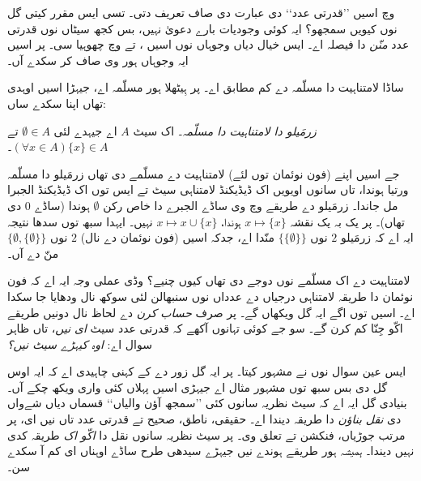 \documentclass[../../../include/open-logic-section]{subfiles}
\begin{document}


 وچ اسیں ’’قدرتی عدد‘‘ دی عبارت دی صاف
تعریف دتی۔ تسی ایس مقرر کیتی گل نوں کیویں سمجھو؟ ایہ کوئی وجودیات بارے
دعویٰ نہیں، بس کجھ سیٹاں نوں قدرتی عدد \emph{منّن} دا فیصلہ اے۔ ایس خیال
دیاں وجوہاں نوں اسیں ، 
تے  وچ چھوہیا سی۔ پر اسیں
ایہ وجوہاں ہور وی صاف کر سکدے آں۔

ساڈا لامتناہیت دا مسلّمہ \citet{VonNeumann1925} دے کم مطابق اے۔
پر ہِیٹھلا ہور مسلّمہ اے، جیہڑا اسیں اوہدی تھاں اپنا سکدے ساں:

\begin{defish}
\emph{زرمَیلو دا \citeyear{Zermelo1908Untersuchungen} لامتناہیت دا مسلّمہ۔}
اک سیٹ $A$ اے جیہدے لئی $\emptyset \in A$ تے
$(\forall x \in A)\{x\} \in A$۔
\end{defish}

جے اسیں اپنے (فون نوئمان توں لئے) لامتناہیت دے مسلّمے دی تھاں زرمَیلو دا
مسلّمہ ورتیا ہوندا، تاں سانوں اویویں اک ڈیڈیکنڈ لامتناہی سیٹ تے ایس توں
اک ڈیڈیکنڈ الجبرا مل جاندا۔ زرمَیلو دے طریقے وچ وی ساڈے الجبرے دا خاص
رکن $\emptyset$ ہوندا (ساڈے $0$ دی تھاں)۔ پر یک بہ یک نقشہ
$x \mapsto \{x\}$ ہوندا، $x \mapsto x \cup \{x\}$ نہیں۔
ایہدا سبھ توں سدھا نتیجہ ایہ اے کہ زرمَیلو $2$ نوں $\{\{\emptyset\}\}$
منّدا اے، جدکہ اسیں (فون نوئمان دے نال) $2$ نوں $\{\emptyset, \{\emptyset\}\}$
منّ دے آں۔

لامتناہیت دے اک مسلّمے نوں دوجے دی تھاں کیوں چنیے؟ وڈی عملی وجہ ایہ اے
کہ فون نوئمان دا طریقہ لامتناہی درجیاں دے عدداں نوں سنبھالن لئی سوکھ نال
ودھایا جا سکدا اے۔ اسیں  توں اگے ایہ گل ویکھاں گے۔
پر صرف \emph{حساب کرن} دے لحاظ نال دونیں طریقے اکّو جِنّا کم کرن گے۔
سو جے کوئی تہانوں آکھے کہ قدرتی عدد سیٹ \emph{ای نیں}، تاں ظاہر سوال اے:
\emph{اوہ کیہڑے سیٹ نیں؟}

ایس عین سوال نوں \citet{Benacerraf1965} نے مشہور کیتا۔ پر ایہ گل زور دے
کے کہنی چاہیدی اے کہ ایہ اوس گل دی بس سبھ توں مشہور مثال اے جیہڑی اسیں
پہلاں کئی واری ویکھ چکے آں۔ بنیادی گل ایہ اے کہ سیٹ نظریہ سانوں کئی
’’سمجھ آؤن والیاں‘‘ قسماں دیاں شےواں دی \emph{نقل بناؤن} دا طریقہ دیندا اے۔
حقیقی، ناطق، صحیح تے قدرتی عدد تاں نیں ای، پر مرتب جوڑیاں، فنکشن تے تعلق وی۔
پر سیٹ نظریہ سانوں نقل دا \emph{اکّو اک} طریقہ کدی نہیں دیندا۔
\emph{ہمیشہ} ہور طریقے ہوندے نیں جیہڑے سیدھی طرح ساڈے اوہناں ای کم آ سکدے سن۔
\end{document}
